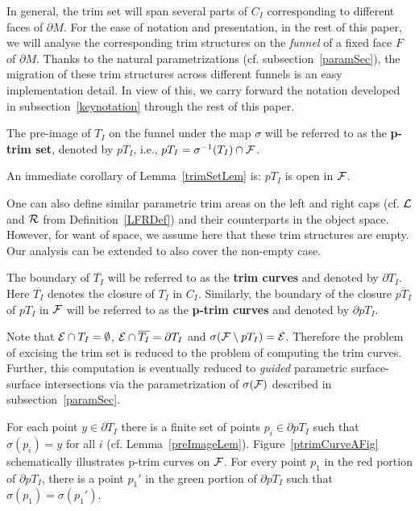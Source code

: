\documentclass{elsart5p}
\begin{document}
In general, the trim set will span several parts of $C_I$ corresponding 
to different faces of $\partial M$. For the ease of notation
and presentation, in the rest of this paper, we will analyse the corresponding
trim structures on the {\em funnel} of a fixed face $F$ of $\partial M$.
Thanks to the natural parametrizations (cf. subsection~\ref{paramSec}), 
the migration of these trim structures across different funnels is an easy
implementation detail. In view of this, we carry forward the notation 
developed in subsection~\ref{keynotation} through the rest of this paper.

\begin{defn} \label{trimSetDef} 
The pre-image of $T_I$ on the funnel under the map $\sigma$ will be 
referred to as the {\bf p-trim set}, denoted by $pT_I$, i.e., 
$pT_I = \sigma^{-1}(T_I) \cap {\cal F}$.
\end{defn}
An immediate corollary of Lemma~\ref{trimSetLem} is:
$pT_I$ is open in ${\cal F}$.

One can also define similar parametric trim areas on the left and right
caps (cf. ${\cal L}$ and ${\cal R}$ from Definition~\ref{LFRDef}) and their counterparts in the object
space. However, for want of space, we assume here that these trim structures are empty. Our analysis can
be extended to also cover the non-empty case.


\begin{defn} \label{trimCurveDef}
The boundary of $\overline{T_I}$ will be referred to as the {\bf trim curves} and denoted by $\partial T_I$. Here $\overline{T_I}$ denotes the closure of 
$T_I$ in $C_I$. Similarly,
the boundary of the closure $\overline{pT_I}$ of $pT_I$ in ${\cal F}$ 
will be referred to as the {\bf p-trim curves} and denoted by $\partial pT_I$.
\end{defn}

Note that ${\cal E} \cap T_I = \emptyset$,
${\cal E} \cap \overline{T_I} = \partial T_I$ and 
$\sigma({\cal F} \setminus pT_I) = {\cal E}$.
Therefore the problem of excising the trim set is 
reduced to the problem of computing the trim curves. Further, 
this computation is eventually reduced to {\em guided} parametric 
surface-surface intersections via the parametrization of $\sigma({\cal F})$ 
described in subsection~\ref{paramSec}.

For each point $y \in \partial T_I$ there is a finite set of points $p_i \in \partial pT_I$ such that $\sigma(p_i) = y$ 
for all $i$ (cf. Lemma~\ref{preImageLem}). 
Figure~\ref{ptrimCurveAFig} schematically illustrates p-trim curves on ${\cal F}$.  For every 
point $p_1$ in the red portion of $\partial pT_I$, there is a point $p_1'$ in the green portion of $\partial pT_I$ 
such that $\sigma(p_1) = \sigma(p_1')$.
\end{document}
